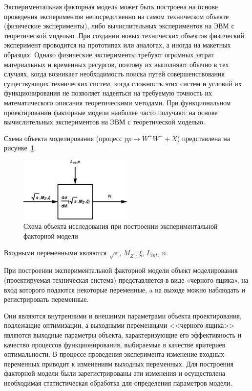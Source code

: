 Экспериментальная факторная модель может быть построена на основе
проведения экспериментов непосредственно на самом техническом объекте
(физические эксперименты), либо вычислительных экспериментов на ЭВМ с
теоретической моделью. При создании новых технических объектов физический
эксперимент проводится на прототипах или аналогах, а иногда на макетных
образцах. Однако физические эксперименты требуют огромных затрат
материальных и временных ресурсов, поэтому их выполняют обычно в тех
случаях, когда возникает необходимость поиска путей совершенствования
существующих технических систем, когда сложность этих систем и условий их
функционирования не позволяет надеяться на требуемую точность их
математического описания теоретическими методами. При функциональном
проектировании факторные модели наиболее часто получают на основе
вычислительных экспериментов на ЭВМ с теоретической моделью. 

Схема объекта
моделирования (процесс $pp \rightarrow W^+W^- + X$) представлена на рисунке~\ref{fig:schema-model}.

\begin{figure}[!h]
	\centering
	\includegraphics[width=0.5\textwidth]{figures/model.eps}
	\caption{Схема объекта исследования при построении экспериментальной
		факторной модели}
	\label{fig:schema-model}
\end{figure}

Входными переменными являются $\sqrt{s}$, ${M}_{{Z}^{\prime}}$, $\xi$, ${L}_{int}$, $n$. 

При построении экспериментальной факторной модели объект
моделирования (проектируемая техническая система) представляется в виде
«черного ящика», на вход которого подаются некоторые переменные, a на
выходе можно наблюдать и регистрировать переменные. 

Они являются внутренними и внешними параметрами объекта проектирования,
подлежащие оптимизации, а выходными переменными <<черного ящика>>
являются выходные параметры объекта, характеризующие его эффективность и
качество процессов функционирования, выбираемые в качестве критериев
оптимальности. В процессе проведения эксперимента изменение входных
переменных приводит к изменениям выходных переменных. Для построения
факторной модели были зарегистрированы эти изменения и осуществлена
необходимая статистическая обработка для определения параметров модели.